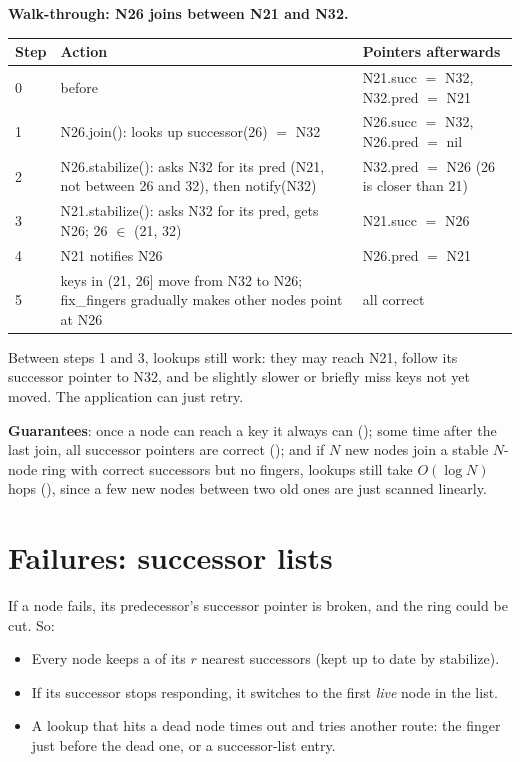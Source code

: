 \textbf{Walk-through: N26 joins between N21 and N32.}
\begin{center}
\small
\begin{tabularx}{\linewidth}{@{}lXl@{}}
\toprule
Step & Action & Pointers afterwards\\
\midrule
0 & before & N21.succ $=$ N32, N32.pred $=$ N21\\
1 & N26.join(): looks up successor(26) $=$ N32 & N26.succ $=$ N32, N26.pred $=$ nil\\
2 & N26.stabilize(): asks N32 for its pred (N21, not between 26 and 32), then notify(N32) & N32.pred $=$ N26 (26 is closer than 21)\\
3 & N21.stabilize(): asks N32 for its pred, gets N26; 26 $\in$ (21, 32) & N21.succ $=$ N26\\
4 & N21 notifies N26 & N26.pred $=$ N21\\
5 & keys in (21, 26] move from N32 to N26; fix\_fingers gradually makes other nodes point at N26 & all correct\\
\bottomrule
\end{tabularx}
\end{center}
Between steps 1 and 3, lookups still work: they may reach N21, follow its successor pointer to N32, and be slightly slower or briefly miss keys not yet moved.
The application can just retry.

\textbf{Guarantees}: once a node can reach a key it always can (); some time after the last join, all successor pointers are correct
(); and if $N$ new nodes join a stable $N$-node ring with correct successors but no fingers, lookups still take $O(\log N)$ hops
(), since a few new nodes between two old ones are just scanned linearly.

\section{Failures: successor lists}

If a node fails, its predecessor's successor pointer is broken, and the ring could be cut. So:
\begin{itemize}
  \item Every node keeps a  of its $r$ nearest successors (kept up to date by stabilize).
  \item If its successor stops responding, it switches to the first \emph{live} node in the list.
  \item A lookup that hits a dead node times out and tries another route: the finger just before the dead one, or a successor-list entry.
\end{itemize}

